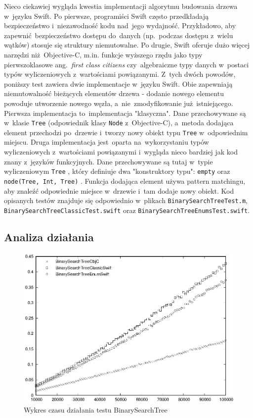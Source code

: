 \documentclass[mgr, shortabstract]{iithesis}
\newcommand{\ang}[1]{ang.~\textit{#1}}
\newcommand{\swiftinline}[1]{
    \texttt{#1}
}
\newcommand{\objcinline}[1]{
    \texttt{#1}
}
\begin{document}
Nieco ciekawiej wygląda kwestia implementacji algorytmu budowania drzewa w~języku Swift. Po pierwsze, programiści Swift często przedkładają bezpieczeństwo i~niezawodność kodu nad~jego wydajność. Przykładowo, aby zapewnić bezpieczeństwo dostępu do~danych (np.~podczas dostępu z~wielu wątków) stosuje się struktury niemutowalne. Po drugie, Swift oferuje dużo więcej narzędzi niż Objective-C, m.in. funkcje wyższego rzędu jako typy pierwszoklasowe \ang{first class citizens} czy~algebraiczne typy danych w~postaci typów wyliczeniowych z~wartościami powiązanymi. Z~tych dwóch powodów, poniższy test zawiera dwie implementacje w~języku Swift. Obie zapewniają niemutowalność bieżących elementów drzewa - dodanie nowego elementu powoduje utworzenie nowego węzła, a~nie~zmodyfikowanie już istniejącego. Pierwsza implementacja to~implementacja "klasyczna". Dane przechowywane są w~klasie \swiftinline{Tree} (odpowiednik klasy \objcinline{Node} z~Objective-C), a~metoda dodająca element przechodzi po~drzewie i~tworzy nowy obiekt typu \swiftinline{Tree} w~odpowiednim miejscu. Druga implementacja jest~oparta na~wykorzystaniu typów wyliczeniowych z~wartościami powiązanymi i~wygląda nieco bardziej jak kod znany z~języków funkcyjnych. Dane przechowywane są tutaj w~typie wyliczeniowym \swiftinline{Tree}, który definiuje dwa "konstruktory typu": \swiftinline{empty} oraz \swiftinline{node(Tree, Int, Tree)}. Funkcja dodająca element używa pattern matchingu, aby znaleźć odpowiednie miejsce w~drzewie i~tam dodaje nowy obiekt. Kod opisanych testów znajduje się odpowiednio w~plikach \texttt{BinarySearchTreeTest.m}, \texttt{BinarySearchTreeClassicTest.swift} oraz \texttt{BinarySearchTreeEnumsTest.swift}.

\subsection{Analiza działania}

\begin{figure}
    \includegraphics{plots/BinarySearchTree.eps}
    \caption{Wykres czasu działania testu BinarySearchTree}
    \label{p:binary_search}
\end{figure}
\end{document}
